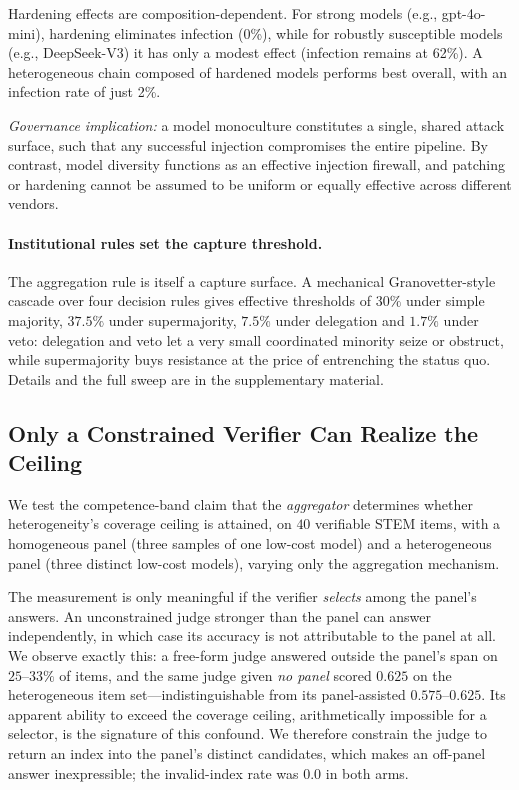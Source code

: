 \documentclass[manuscript,screen,review]{acmart}
\begin{document}
Hardening effects are composition-dependent. For strong models (e.g., gpt-4o-mini), hardening eliminates infection (0\%), while for robustly susceptible models (e.g., DeepSeek-V3) it has only a modest effect (infection remains at 62\%). A heterogeneous chain composed of hardened models performs best overall, with an infection rate of just 2\%.

\emph{Governance implication:} a model monoculture constitutes a single, shared attack surface, such that any successful injection compromises the entire pipeline. By contrast, model diversity functions as an effective injection firewall, and patching or hardening cannot be assumed to be uniform or equally effective across different vendors.


\paragraph{Institutional rules set the capture threshold.} The aggregation rule
is itself a capture surface. A mechanical Granovetter-style cascade over four
decision rules gives effective thresholds of $30\%$ under simple majority, $37.5\%$
under supermajority, $7.5\%$ under delegation and $1.7\%$ under veto: delegation
and veto let a very small coordinated minority seize or obstruct, while
supermajority buys resistance at the price of entrenching the status quo. Details
and the full sweep are in the supplementary material.

\subsection{Only a Constrained Verifier Can Realize the Ceiling}
\label{sec:verif}
We test the competence-band claim that the \emph{aggregator} determines whether
heterogeneity's coverage ceiling is attained, on $40$ verifiable STEM items, with a
homogeneous panel (three samples of one low-cost model) and a heterogeneous panel
(three distinct low-cost models), varying only the aggregation mechanism.

The measurement is only meaningful if the verifier \emph{selects} among the
panel's answers. An unconstrained judge stronger than the panel can answer
independently, in which case its accuracy is not attributable to the panel at
all. We observe exactly this: a free-form judge answered outside the panel's span
on $25$--$33\%$ of items, and the same judge given \emph{no panel} scored $0.625$
on the heterogeneous item set---indistinguishable from its panel-assisted
$0.575$--$0.625$. Its apparent ability to exceed the coverage ceiling, arithmetically
impossible for a selector, is the signature of this confound. We therefore
constrain the judge to return an index into the panel's distinct candidates, which
makes an off-panel answer inexpressible; the invalid-index rate was $0.0$ in both
arms.
\end{document}
